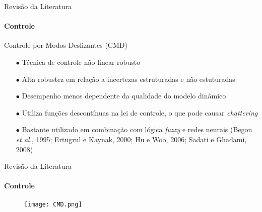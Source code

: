 \documentclass[25pt,landscape]{beamer}
\begin{document}
\begin{frame}{Revisão da Literatura}
    \framesubtitle{Controle}
    \begin{block}{Controle por Modos Deslizantes (CMD)}
        \begin{itemize}
            \item[$\bullet$] Técnica de controle não linear robusto \\[8pt]
            \item[$\bullet$] Alta robustez em relação a incertezas estruturadas e não estuturadas \\[8pt]
            \item[$\bullet$] Desempenho menos dependente da qualidade do modelo dinâmico \\[8pt]
            \item[$\bullet$] Utiliza funções descontínuas na lei de controle, o que pode causar \emph{chattering} \\[8pt]
            \item[$\bullet$] Bastante utilizado em combinação com lógica \emph{fuzzy} e redes neurais (Begon \emph{et al.}, 1995; Ertugrul e Kaynak, 2000; Hu e Woo, 2006; Sadati e Ghadami, 2008) \\[8pt]
        \end{itemize}
    \end{block}
\end{frame}

\begin{frame}{Revisão da Literatura}
    \framesubtitle{Controle}
    \begin{figure}[!h]
        \centering
        \texttt{[image: CMD.png]}
    \end{figure}  
\end{frame}
\end{document}
